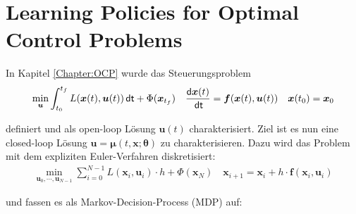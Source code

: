\documentclass[a4paper, 12pt]{scrartcl}
\newcommand{\dt}{\thinspace \mathsf{dt}}
\begin{document}
\section{Learning Policies for Optimal Control Problems}

In Kapitel \ref{Chapter:OCP} wurde das Steuerungsproblem 
%
\begin{align*}
    \min_{\bm{u}} \int_{t_0}^{t_f} L(\bm{x}(t), \bm{u}(t)) \dt + \Phi(\bm{x}_{t_f})
    \quad
    \frac{\mathsf{d}\bm{x}(t)}{\dt}
    =
    \bm{f}(\bm{x}(t),\bm{u}(t))
    \quad
    \bm{x}(t_0) = \bm{x}_0
\end{align*}

definiert und als open-loop Lösung $\bm{u}(t)$ charakterisiert. Ziel ist es nun 
eine closed-loop Lösung $\bm{u} = \bm{\mu}(t,\bm{x};\bm{\theta})$ zu 
charakterisieren. Dazu wird das Problem  
mit dem expliziten Euler-Verfahren diskretisiert: 
%
\begin{align*}
    \min_{\bm{u}_0, \cdots , \bm{u}_{N-1}}
    \sum_{i=0}^{N-1} 
    L(\bm{x}_i, \bm{u}_i) \cdot h + \Phi(\bm{x}_N)
    \quad
    \bm{x}_{i+1} = \bm{x}_{i} + h \cdot \bm{f}(\bm{x}_i, \bm{u}_i)
\end{align*}

und fassen es 
als Markov-Decision-Process (MDP) auf:
\end{document}
